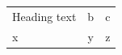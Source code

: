\documentclass{article}
\begin{document}
\begin{tabular}{m{4cm} c c}
\multicolumn{1}{L{5cm}}{Heading text} & b & c \\
x & y & z \\
\end{tabular}
\end{document}
